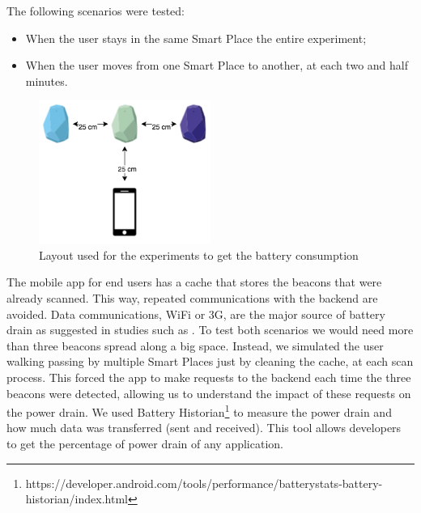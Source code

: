 The following scenarios were tested:
\begin{itemize}
  \item
  When the user stays in the same Smart Place the entire experiment;
  \item
  When the user moves from one Smart Place to another, at each two and half minutes.
\end{itemize}


\begin{figure}[!ht]
  \centering
    \includegraphics[width=0.5\textwidth, keepaspectratio]{images/experiments_battery_layout}
    \caption[Layout for experiments of battery consumption]{Layout used for the experiments to get the battery consumption}
    \label{fig:layout_experiments_battery_consumption}
\end{figure}

The mobile app for end users has a cache that stores the beacons that were already scanned.
This way, repeated communications with the backend are avoided.
Data communications, \gls{WiFi} or \gls{3G}, are the major source of battery drain as suggested in studies such as \cite{energy}.
To test both scenarios we would need more than three beacons spread along a big space.
Instead, we simulated the user walking passing by multiple Smart Places just by cleaning the cache, at each scan process.
This forced the app to make requests to the backend each time the three beacons were detected, allowing us to understand the impact of these requests on the power drain.
We used Battery Historian\footnote{https://developer.android.com/tools/performance/batterystats-battery-historian/index.html} to measure the power drain and how much data was transferred (sent and received). This tool allows developers to get the percentage of power drain of any application.

